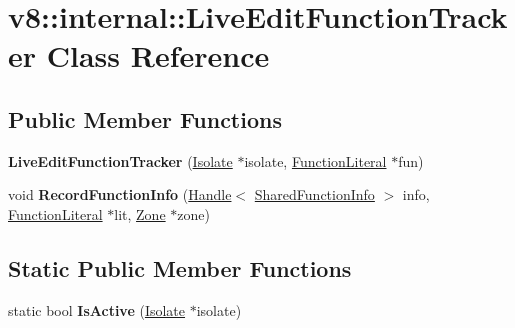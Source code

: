 \hypertarget{classv8_1_1internal_1_1_live_edit_function_tracker}{}\section{v8\+:\+:internal\+:\+:Live\+Edit\+Function\+Tracker Class Reference}
\label{classv8_1_1internal_1_1_live_edit_function_tracker}
\subsection*{Public Member Functions}
\begin{DoxyCompactItemize}
\item 
{\bfseries Live\+Edit\+Function\+Tracker} (\hyperlink{classv8_1_1internal_1_1_isolate}{Isolate} $\ast$isolate, \hyperlink{classv8_1_1internal_1_1_function_literal}{Function\+Literal} $\ast$fun)\hypertarget{classv8_1_1internal_1_1_live_edit_function_tracker_a24d49343471b62692097605f18673b18}{}\label{classv8_1_1internal_1_1_live_edit_function_tracker_a24d49343471b62692097605f18673b18}

\item 
void {\bfseries Record\+Function\+Info} (\hyperlink{classv8_1_1internal_1_1_handle}{Handle}$<$ \hyperlink{classv8_1_1internal_1_1_shared_function_info}{Shared\+Function\+Info} $>$ info, \hyperlink{classv8_1_1internal_1_1_function_literal}{Function\+Literal} $\ast$lit, \hyperlink{classv8_1_1internal_1_1_zone}{Zone} $\ast$zone)\hypertarget{classv8_1_1internal_1_1_live_edit_function_tracker_aa480f414b4f84b5f28efa32995321f4b}{}\label{classv8_1_1internal_1_1_live_edit_function_tracker_aa480f414b4f84b5f28efa32995321f4b}

\end{DoxyCompactItemize}
\subsection*{Static Public Member Functions}
\begin{DoxyCompactItemize}
\item 
static bool {\bfseries Is\+Active} (\hyperlink{classv8_1_1internal_1_1_isolate}{Isolate} $\ast$isolate)\hypertarget{classv8_1_1internal_1_1_live_edit_function_tracker_a5fdc8185d6ccf7a364ff0913e692c2ce}{}\label{classv8_1_1internal_1_1_live_edit_function_tracker_a5fdc8185d6ccf7a364ff0913e692c2ce}

\end{DoxyCompactItemize}
